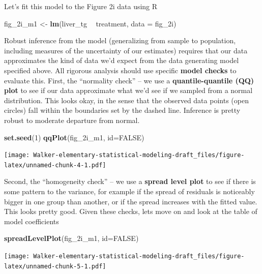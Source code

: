 \documentclass[]{book}
\newenvironment{Shaded}{\begin{snugshade}}{\end{snugshade}}
\newcommand{\DataTypeTok}[1]{\textcolor[rgb]{0.13,0.29,0.53}{#1}}
\newcommand{\DecValTok}[1]{\textcolor[rgb]{0.00,0.00,0.81}{#1}}
\newcommand{\KeywordTok}[1]{\textcolor[rgb]{0.13,0.29,0.53}{\textbf{#1}}}
\newcommand{\NormalTok}[1]{#1}
\newcommand{\OperatorTok}[1]{\textcolor[rgb]{0.81,0.36,0.00}{\textbf{#1}}}
\newcommand{\OtherTok}[1]{\textcolor[rgb]{0.56,0.35,0.01}{#1}}
\newcommand{\StringTok}[1]{\textcolor[rgb]{0.31,0.60,0.02}{#1}}
\begin{document}
Let's fit this model to the Figure 2i data using R

\begin{Shaded}
\begin{Highlighting}[]
\NormalTok{fig_2i_m1 <-}\StringTok{ }\KeywordTok{lm}\NormalTok{(liver_tg }\OperatorTok{~}\StringTok{ }\NormalTok{treatment, }\DataTypeTok{data =}\NormalTok{ fig_2i)}
\end{Highlighting}
\end{Shaded}

Robust inference from the model (generalizing from sample to population, including measures of the uncertainty of our estimates) requires that our data approximates the kind of data we'd expect from the data generating model specified above. All rigorous analysis should use specific \textbf{model checks} to evaluate this. First, the ``normality check'' -- we use a \textbf{quantile-quantile (QQ) plot} to see if our data approximate what we'd see if we sampled from a normal distribution. This looks okay, in the sense that the observed data points (open circles) fall within the boundaries set by the dashed line. Inference is pretty robust to moderate departure from normal.

\begin{Shaded}
\begin{Highlighting}[]
\KeywordTok{set.seed}\NormalTok{(}\DecValTok{1}\NormalTok{)}
\KeywordTok{qqPlot}\NormalTok{(fig_2i_m1, }\DataTypeTok{id=}\OtherTok{FALSE}\NormalTok{)}
\end{Highlighting}
\end{Shaded}

\texttt{[image: Walker-elementary-statistical-modeling-draft\_files/figure-latex/unnamed-chunk-4-1.pdf]}

Second, the ``homogeneity check'' -- we use a \textbf{spread level plot} to see if there is some pattern to the variance, for example if the spread of residuals is noticeably bigger in one group than another, or if the spread increases with the fitted value.
This looks pretty good. Given these checks, lets move on and look at the table of model coefficients

\begin{Shaded}
\begin{Highlighting}[]
\KeywordTok{spreadLevelPlot}\NormalTok{(fig_2i_m1, }\DataTypeTok{id=}\OtherTok{FALSE}\NormalTok{)}
\end{Highlighting}
\end{Shaded}

\texttt{[image: Walker-elementary-statistical-modeling-draft\_files/figure-latex/unnamed-chunk-5-1.pdf]}
\end{document}
